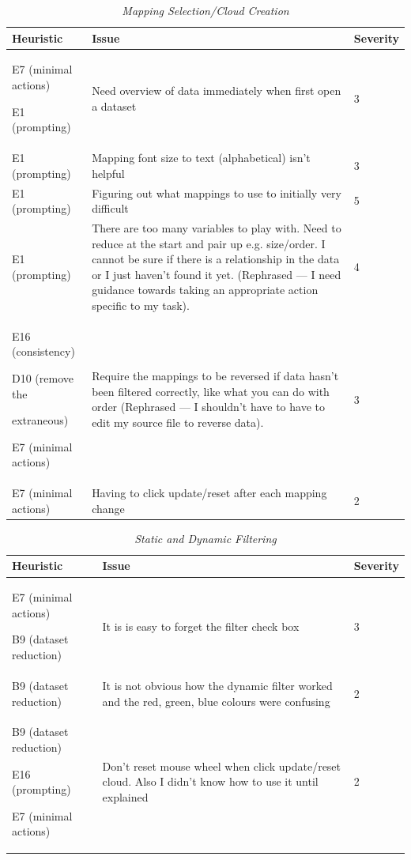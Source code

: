\begin{table}[!htb]
\centering
\caption{\textit{Mapping Selection/Cloud Creation}}
\begin{tabular}{|p{4cm}|p{8cm}|x{2cm}|} \hline
\textbf{Heuristic}&\textbf{Issue}&\textbf{Severity}\\ \hline
E7 (minimal actions)\par E1 (prompting) & Need overview of data immediately when first open a dataset & 3 \\ \hline
E1 (prompting) & Mapping font size to text (alphabetical) isn't helpful & 3 \\ \hline
E1 (prompting) & Figuring out what mappings to use to initially very difficult & 5 \\ \hline
E1 (prompting) & There are too many variables to play with. Need to reduce at the start and pair up e.g. size/order. I cannot be sure if there is a relationship in the data or I just haven't found it yet. (Rephrased --- I need guidance towards taking an appropriate  action specific to my task). & 4 \\ \hline
E16 (consistency)\par D10 (remove the\par extraneous)\par E7 (minimal actions) & Require the mappings to be reversed if data hasn't been filtered correctly, like what you can do with order (Rephrased --- I shouldn't have to have to edit my source file to reverse data). & 3 \\ \hline
E7 (minimal actions) & Having to click update/reset after each mapping change & 2\\
\hline\end{tabular}
\label{table:mappingselection}
\end{table}

\begin{table}[!htb]
\centering
\caption{\textit{Static and Dynamic Filtering}}
\begin{tabular}{|p{4cm}|p{8cm}|x{2cm}|} \hline
\textbf{Heuristic}&\textbf{Issue}&\textbf{Severity}\\ \hline
E7 (minimal actions)\par B9 (dataset reduction) & It is is easy to forget the filter check box & 3 \\ \hline
B9 (dataset reduction) & It is not obvious how the dynamic filter worked and the red, green, blue colours were confusing & 2 \\ \hline
B9 (dataset reduction)\par E16 (prompting)\par E7 (minimal actions) & Don't reset mouse wheel when click update/reset cloud. Also I didn't know how to use it until explained & 2 \\
\hline\end{tabular}
\label{table:filtering}
\end{table}

